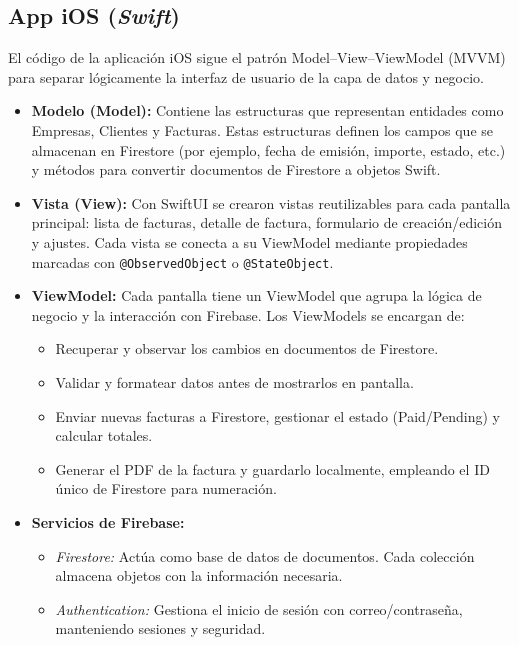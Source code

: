 \subsection{App iOS (\textit{Swift})}

\begin{large}

El código de la aplicación iOS sigue el patrón Model–View–ViewModel (MVVM) para separar lógicamente la interfaz de usuario de la capa de datos y negocio. 
\begin{itemize}
  \item \textbf{Modelo (Model):} Contiene las estructuras que representan entidades como Empresas, Clientes y Facturas. Estas estructuras definen los campos que se almacenan en Firestore (por ejemplo, fecha de emisión, importe, estado, etc.) y métodos para convertir documentos de Firestore a objetos Swift.
  \item \textbf{Vista (View):} Con SwiftUI se crearon vistas reutilizables para cada pantalla principal: lista de facturas, detalle de factura, formulario de creación/edición y ajustes. Cada vista se conecta a su ViewModel mediante propiedades marcadas con \texttt{@ObservedObject} o \texttt{@StateObject}.
  \item \textbf{ViewModel:} Cada pantalla tiene un ViewModel que agrupa la lógica de negocio y la interacción con Firebase. Los ViewModels se encargan de:
    \begin{itemize}
      \item Recuperar y observar los cambios en documentos de Firestore.
      \item Validar y formatear datos antes de mostrarlos en pantalla.
      \item Enviar nuevas facturas a Firestore, gestionar el estado (Paid/Pending) y calcular totales.
      \item Generar el PDF de la factura y guardarlo localmente, empleando el ID único de Firestore para numeración.
    \end{itemize}
  \item \textbf{Servicios de Firebase:}  
    \begin{itemize}
      \item \textit{Firestore:} Actúa como base de datos de documentos. Cada colección almacena objetos con la información necesaria.
      \item \textit{Authentication:} Gestiona el inicio de sesión con correo/contraseña, manteniendo sesiones y seguridad.
    \end{itemize}
\end{itemize}

\end{large}

